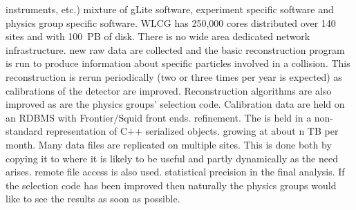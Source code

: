 \documentclass[times]{cpeauth}
\begin{document}
%
instruments, etc.)
%
mixture of gLite software, experiment specific software and physics group
specific software. WLCG has 250,000 cores distributed over 140 sites and with
100~PB of disk. There is no wide area dedicated network infrastructure.
%
%
new raw data are collected and the basic reconstruction program is run to
produce information about specific particles involved in a collision. This
reconstruction is rerun periodically (two or three times per year is expected)
as calibrations of the detector are improved. Reconstruction algorithms are also
improved as are the physics groups' selection code. Calibration data are held on
an RDBMS with Frontier/Squid front ends.
%
%
refinement. The is held in a non-standard representation of C++ serialized
objects.
%
%
growing at about n TB per month. Many data files are replicated on multiple
sites. This is done both by copying it to where it is likely to be useful and
partly dynamically as the need arises.
%
%
remote file access is also used.
%
%
statistical precision in the final analysis. If the selection code has been
improved then naturally the physics groups would like to see the results as soon
as possible.
\end{document}
